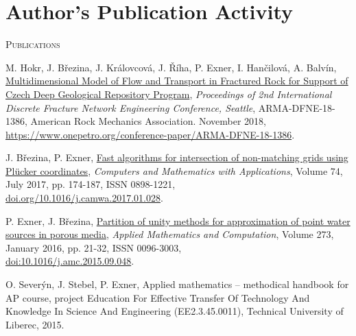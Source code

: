 \documentclass[bibliography=totocnumbered,dvipsnames,FM,Dis]{tulthesis_autoreferat}
\begin{document}
\chapter{Author's Publication Activity} \label{chap:publications}
% 
{\large\textsc{Publications}}
\begin{itemize}[label={}, leftmargin=*]

{\small
\item
M. Hokr, J. B{\v r}ezina, J. Kr{\' a}lovcov{\' a}, J. {\v R}{\' i}ha, P. Exner, I. Han{\v c}ilov{\' a}, A. Balv{\' i}n,
\href{https://www.onepetro.org/conference-paper/ARMA-DFNE-18-1386}
{Multidimensional Model of Flow and Transport in Fractured Rock for Support of Czech Deep Geological Repository Program},
\emph{Proceedings of 2nd International Discrete Fracture Network Engineering Conference, Seattle}, ARMA-DFNE-18-1386,
American Rock Mechanics Association. November 2018,\\
\href{https://www.onepetro.org/conference-paper/ARMA-DFNE-18-1386}{https://www.onepetro.org/conference-paper/ARMA-DFNE-18-1386}.

\item
J. B{\v r}ezina, P. Exner, \href{http://www.sciencedirect.com/science/article/pii/S0898122117300792}{Fast algorithms for intersection of non-matching grids using Plücker coordinates},
\emph{Computers and Mathematics with Applications}, Volume 74, July 2017, pp. 174-187, ISSN 0898-1221,\\
\href{https://doi.org/10.1016/j.camwa.2017.01.028}{doi.org/10.1016/j.camwa.2017.01.028}.

\item
P. Exner, J. B{\v r}ezina, \href{http://www.sciencedirect.com/science/article/pii/S0096300315012862}{Partition of unity methods for approximation of point water sources in porous media},
\emph{Applied Mathematics and Computation}, Volume 273, January 2016, pp. 21-32, ISSN 0096-3003,\\
\href{http://dx.doi.org/10.1016/j.amc.2015.09.048}{doi:10.1016/j.amc.2015.09.048}.

\item
O. Sever{\' y}n, J. Stebel, P. Exner, Applied mathematics -- methodical handbook for AP course,
project Education For Effective Transfer Of Technology And Knowledge In Science And Engineering (EE2.3.45.0011),
Technical University of Liberec, 2015.

}
\end{itemize}
\end{document}
